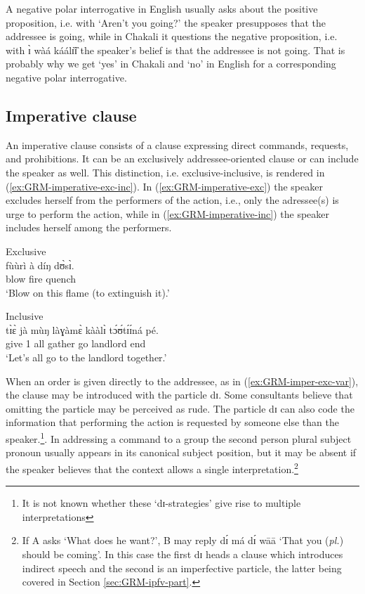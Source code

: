 A negative polar interrogative in English usually asks about the
positive proposition, i.e. with `Aren't you going?' the speaker presupposes 
  that the addressee is going,   while in Chakali it questions the
negative proposition, i.e. with {\sls  ɪ̀ wàá káálɪ̏ɪ̏} the speaker's belief
is that the addressee is not going. That is probably why we get `yes' in Chakali
and `no' in English for a corresponding negative polar interrogative.



\subsection{Imperative clause}
\label{sec:GRM-imper-clause}

An imperative clause consists of a clause  expressing direct commands, 
requests, and prohibitions. It can be an exclusively addressee-oriented clause 
or  can include the speaker as well. This distinction, i.e. 
exclusive-inclusive, is rendered in  (\ref{ex:GRM-imperative-exc-inc}). In 
(\ref{ex:GRM-imperative-exc}) the  speaker excludes herself  from the 
performers of the action, i.e., only the adressee(s) is urge to perform the 
action,  while in  (\ref{ex:GRM-imperative-inc}) the speaker includes 
herself among the performers.

\ea\label{ex:GRM-imperative-exc-inc}

\ea\label{ex:GRM-imperative-exc}{\rm Exclusive}\\
\gll fùùrì à díŋ dʊ̀sɪ̀.\\
blow {\art} fire quench\\
\glt `Blow on this flame (to extinguish it).'

\ex\label{ex:GRM-imperative-inc}{\rm Inclusive}\\
\gll tɪ̀ɛ̀ jà mùŋ làɣàmɛ̀ kààlɪ̀ tɔ́ʊ́tɪ́ɪ́ná  pé.\\
give {1\pl} all gather go landlord end\\
\glt `Let's all go to the landlord  together.'

\z
\z

When an order is given directly to the addressee, as in 
(\ref{ex:GRM-imper-exc-var}), the clause may be introduced with the particle 
{\sls dɪ}. Some consultants believe that omitting the particle may be perceived 
as rude.  The particle {\sls dɪ} can also code the information that performing 
the action is requested by someone else than the speaker.\footnote{It is not 
known whether these `{\sls dɪ}-strategies' give rise to multiple 
interpretations}.  In addressing a command to a group the second person plural 
subject pronoun  usually appears in its canonical subject position, but it may 
be absent if the speaker believes that the context allows a single 
interpretation.\footnote{If A asks `What does he want?', B may reply {\sls dɪ́  
má dɪ́ wāā} `That you ({\it pl.}) should be coming'. In this case the first 
{\sls dɪ} heads a  clause which introduces indirect speech and the second is an 
imperfective particle,  the latter being covered in Section 
\ref{sec:GRM-ipfv-part}. }


